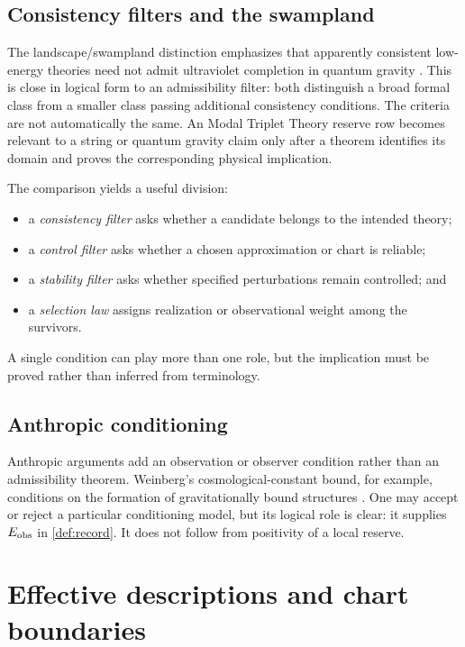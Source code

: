 \documentclass[11pt]{article}
\theoremstyle{definition}
\theoremstyle{remark}
\newcommand{\1}{\mathbf 1}
\newcommand{\MTT}{Modal Triplet Theory}
\begin{document}
\subsection{Consistency filters and the swampland}

The landscape/swampland distinction emphasizes that apparently consistent
low-energy theories need not admit ultraviolet completion in quantum
gravity \cite{Vafa2005}.  This is close in logical form to an admissibility
filter: both distinguish a broad formal class from a smaller class passing
additional consistency conditions.  The criteria are not automatically
the same.  An \MTT{} reserve row becomes relevant to a string or quantum
gravity claim only after a theorem identifies its domain and proves the
corresponding physical implication.

The comparison yields a useful division:
\begin{itemize}[leftmargin=2em]
\item a \emph{consistency filter} asks whether a candidate belongs to the
      intended theory;
\item a \emph{control filter} asks whether a chosen approximation or chart
      is reliable;
\item a \emph{stability filter} asks whether specified perturbations remain
      controlled; and
\item a \emph{selection law} assigns realization or observational weight
      among the survivors.
\end{itemize}
A single condition can play more than one role, but the implication must be
proved rather than inferred from terminology.

\subsection{Anthropic conditioning}

Anthropic arguments add an observation or observer condition rather than
an admissibility theorem.  Weinberg's cosmological-constant bound, for
example, conditions on the formation of gravitationally bound structures
\cite{Weinberg1987}.  One may accept or reject a particular conditioning
model, but its logical role is clear: it supplies \(E_{\rm obs}\) in
\cref{def:record}.  It does not follow from positivity of a local reserve.

\section{Effective descriptions and chart boundaries}
\label{sec:eft}
\end{document}
